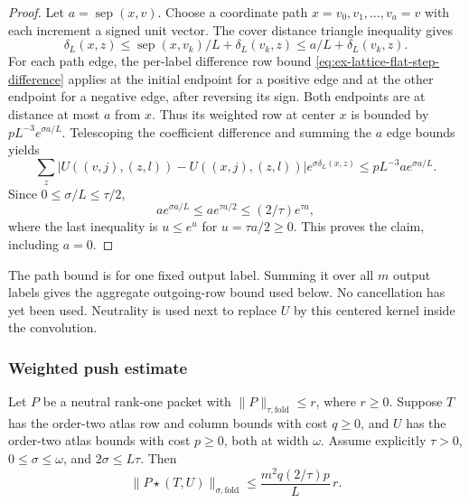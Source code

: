 \begin{proof}
Let $a=\operatorname{sep}(x,v)$. Choose a coordinate path
$x=v_0,v_1,\ldots,v_a=v$ with each increment a signed unit vector. The
cover distance triangle inequality gives
\[
 \delta_L(x,z)\leq \operatorname{sep}(x,v_{k})/L+
                         \delta_L(v_k,z)
 \leq a/L+\delta_L(v_k,z).
\]
For each path edge, the per-label difference row bound
\eqref{eq:ex-lattice-flat-step-difference} applies at the initial endpoint
for a positive edge and at the other endpoint for a negative edge, after
reversing its sign. Both endpoints are at distance at most $a$ from $x$.
Thus its weighted row at center $x$ is bounded by $pL^{-3}e^{\sigma a/L}$. Telescoping the
coefficient difference and summing the $a$ edge bounds yields
\[
 \sum_z |U((v,j),(z,l))-U((x,j),(z,l))|e^{\sigma\delta_L(x,z)}
 \leq pL^{-3}a e^{\sigma a/L}.
\]
Since $0\leq\sigma/L\leq\tau/2$,
\[
 a e^{\sigma a/L}\leq a e^{\tau a/2}
       \leq (2/\tau)e^{\tau a},
\]
where the last inequality is $u\leq e^u$ for $u=\tau a/2\geq0$.
This proves the claim, including $a=0$.
\end{proof}

\begin{remark}
The path bound is for one fixed output label. Summing it over all $m$ output
labels gives the aggregate outgoing-row bound used below.
No cancellation has yet been used. Neutrality is used next to replace $U$ by
this centered kernel inside the convolution.
\end{remark}

\subsubsection{Weighted push estimate}

\begin{lemma}
\label{lem:ex-lattice-flat-step-convolution}
Let $P$ be a neutral rank-one packet with
$\|P\|_{\tau,\mathrm{fold}}\leq r$, where $r\geq0$. Suppose $T$ has the
order-two atlas row and column bounds with cost $q\geq0$, and $U$ has the
order-two atlas bounds with cost $p\geq0$, both at width $\omega$. Assume
explicitly $\tau>0$, $0\leq\sigma\leq\omega$, and $2\sigma\leq L\tau$. Then
\[
 \|P\star(T,U)\|_{\sigma,\mathrm{fold}}
 \leq \frac{m^2 q(2/\tau)p}{L}\,r.
 \label{eq:ex-lattice-flat-step-folded}
\]
\end{lemma}

